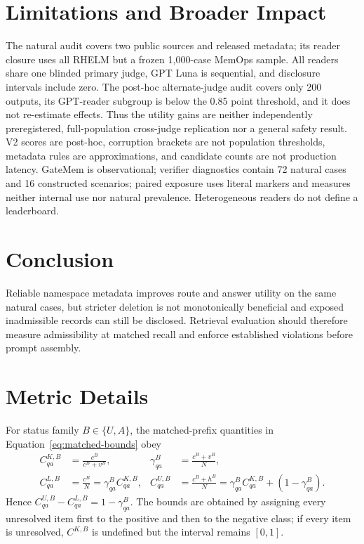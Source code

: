 \documentclass{article}
\begin{document}
\section{Limitations and Broader Impact}

The natural audit covers two public sources and released metadata; its reader closure
uses all RHELM but a frozen 1,000-case MemOps sample.  All readers share one blinded
primary judge, GPT Luna is sequential, and disclosure intervals include zero.  The
post-hoc alternate-judge audit covers only 200 outputs, its GPT-reader subgroup is
below the 0.85 point threshold, and it does not re-estimate effects.  Thus the utility
gains are neither independently preregistered, full-population cross-judge
replication nor a general safety result.  V2 scores are post-hoc, corruption brackets are not
population thresholds, metadata rules are approximations, and candidate counts are
not production latency.  GateMem is
observational; verifier diagnostics contain 72 natural cases and 16 constructed
scenarios; paired exposure uses literal markers and measures neither internal use nor
natural prevalence.  Heterogeneous readers do not define a leaderboard.

\section{Conclusion}

Reliable namespace metadata improves route and answer utility on the same natural
cases, but stricter deletion is not monotonically beneficial and exposed
inadmissible records can still be disclosed.  Retrieval evaluation should therefore
measure admissibility at matched recall and enforce established violations before
prompt assembly.




\appendix

\section{Metric Details}
\label{app:metric-details}

For status family $B\in\{U,A\}$, the matched-prefix quantities in
Equation~\ref{eq:matched-bounds} obey
\begin{align}
C^{K,B}_{qa}&=\frac{c^B}{c^B+v^B}, &
\gamma^B_{qa}&=\frac{c^B+v^B}{N},\label{eq:known-coverage}\\
C^{L,B}_{qa}&=\frac{c^B}{N}=\gamma^B_{qa}C^{K,B}_{qa}, &
C^{U,B}_{qa}&=\frac{c^B+h^B}{N}
=\gamma^B_{qa}C^{K,B}_{qa}+(1-\gamma^B_{qa}).
\label{eq:partial-id}
\end{align}
Hence $C^{U,B}_{qa}-C^{L,B}_{qa}=1-\gamma^B_{qa}$.  The bounds are obtained by
assigning every unresolved item first to the positive and then to the negative class;
if every item is unresolved, $C^{K,B}$ is undefined but the interval remains $[0,1]$.
\end{document}
